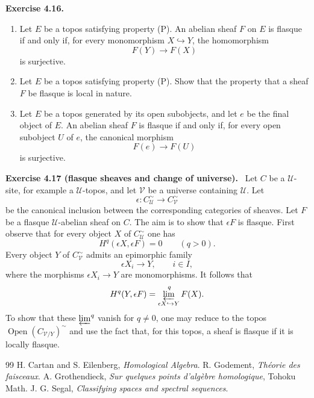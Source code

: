 \documentclass[11pt]{article}
\newcommand{\U}{\mathcal{U}}
\newcommand{\V}{\mathcal{V}}
\newcommand{\Ouv}{\operatorname{Open}}
\newenvironment{remarktext}[1]{\par\medskip\noindent\textbf{#1.}\ }{\par\medskip}
\begin{document}
\begin{remarktext}{Exercise 4.16}
\begin{enumerate}[label=\alph*)]
\item Let $E$ be a topos satisfying property (P). An abelian sheaf $F$ on $E$ is flasque if and only if, for every monomorphism $X\hookrightarrow Y$, the homomorphism
\[
F(Y)\longrightarrow F(X)
\]
is surjective.

\item Let $E$ be a topos satisfying property (P). Show that the property that a sheaf $F$ be flasque is local in nature.

\item Let $E$ be a topos generated by its open subobjects, and let $e$ be the final object of $E$. An abelian sheaf $F$ is flasque if and only if, for every open subobject $U$ of $e$, the canonical morphism
\[
F(e)\longrightarrow F(U)
\]
is surjective.
\end{enumerate}
\end{remarktext}

\begin{remarktext}{Exercise 4.17 (flasque sheaves and change of universe)}
Let $C$ be a $\U$-site, for example a $\U$-topos, and let $\V$ be a universe containing $\U$. Let
\[
\epsilon:C^\sim_\U\longrightarrow C^\sim_\V
\]
be the canonical inclusion between the corresponding categories of sheaves. Let $F$ be a flasque $\U$-abelian sheaf on $C$. The aim is to show that $\epsilon F$ is flasque. First observe that for every object $X$ of $C^\sim_\U$ one has
\[
H^q(\epsilon X,\epsilon F)=0\qquad(q>0).
\]
Every object $Y$ of $C^\sim_\V$ admits an epimorphic family
\[
\epsilon X_i\to Y,\qquad i\in I,
\]
where the morphisms $\epsilon X_i\to Y$ are monomorphisms. It follows that
\[
H^q(Y,\epsilon F)=
\varprojlim_{\epsilon X\hookrightarrow Y}^{\,q} F(X).
\]
To show that these $\varprojlim^q$ vanish for $q\neq0$, one may reduce to the topos $\Ouv(C_{\V/Y})^\sim$ and use the fact that, for this topos, a sheaf is flasque if it is locally flasque.
\end{remarktext}


\begin{thebibliography}{99}
 H. Cartan and S. Eilenberg, \emph{Homological Algebra}.
 R. Godement, \emph{Th\'eorie des faisceaux}.
 A. Grothendieck, \emph{Sur quelques points d'alg\`ebre homologique}, Tohoku Math. J.
 G. Segal, \emph{Classifying spaces and spectral sequences}.
\end{thebibliography}

\bigskip
\end{document}
